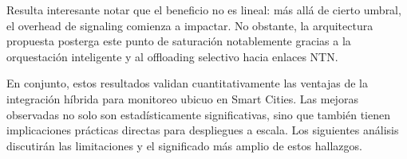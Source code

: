 Resulta interesante notar que el beneficio no es lineal: más allá de cierto umbral, el overhead de signaling comienza a impactar. No obstante, la arquitectura propuesta posterga este punto de saturación notablemente gracias a la orquestación inteligente y al offloading selectivo hacia enlaces NTN. 

En conjunto, estos resultados validan cuantitativamente las ventajas de la integración híbrida para monitoreo ubicuo en Smart Cities. Las mejoras observadas no solo son estadísticamente significativas, sino que también tienen implicaciones prácticas directas para despliegues a escala. Los siguientes análisis discutirán las limitaciones y el significado más amplio de estos hallazgos.